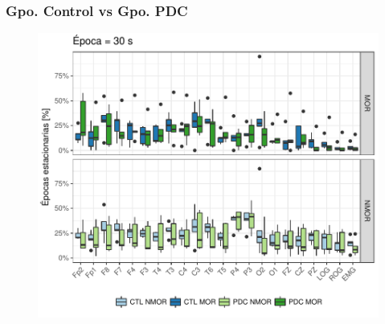 \documentclass[serif,mathserif,professionalfont]{beamer}
\begin{document}
\begin{frame}\frametitle{Gpo. Control vs Gpo. PDC}
\begin{figure}
\centering
\includegraphics[width=0.8\linewidth]
{./img_art_dfa/Comparacion_gpos_MOR_NMOR_v3.pdf} 
\end{figure}
\end{frame}








\end{document}
